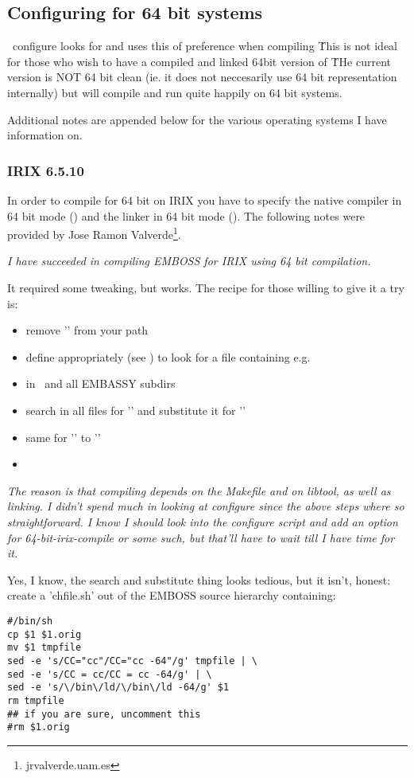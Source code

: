 \documentclass{report}
\begin{document}
\subsection{Configuring for 64 bit systems}

\EMBOSS\ configure looks for  and uses this of preference when compiling \EMBOSS\. This is not ideal for those who wish to have a compiled and linked 64bit version of \EMBOSS\. THe current version is NOT 64 bit clean (ie. it does not neccesarily use 64 bit representation internally) but will compile and run quite happily on 64 bit systems.

Additional notes are appended below for the various operating systems I have information on. 

\subsubsection{IRIX 6.5.10}

In order to compile for 64 bit on IRIX you have to specify the native compiler in 64 bit mode () and the linker in 64 bit mode (). The following notes were provided by Jose Ramon Valverde\footnote{jrvalverde\@@cnb.uam.es}. 


{\it I have succeeded in compiling EMBOSS for IRIX using 64 bit
compilation.

It required some tweaking, but works. The recipe for those willing to
give it a try is: }

\begin{itemize}
	\item remove '' from your path
	\item define  appropriately (see ) to look for a  file containing e.g. 
	\item {} in \EMBOSS\ and all EMBASSY subdirs
	\item search in all files for '' and substitute it for ''
	\item same for '' to ''
	\item {}
\end{itemize}

{\it The reason is that compiling depends on the Makefile and on libtool,
as well as linking. I didn't spend much in looking at configure since
the above steps where so straightforward. I know I should look into
the configure script and add an option for 64-bit-irix-compile or some
such, but that'll have to wait till I have time for it.

Yes, I know, the search and substitute thing looks tedious, but it
isn't, honest: create a 'chfile.sh' out of the EMBOSS source hierarchy
containing: }
\begin{verbatim}
#/bin/sh
cp $1 $1.orig
mv $1 tmpfile
sed -e 's/CC="cc"/CC="cc -64"/g' tmpfile | \
sed -e 's/CC = cc/CC = cc -64/g' | \
sed -e 's/\/bin\/ld/\/bin\/ld -64/g' $1 
rm tmpfile
## if you are sure, uncomment this 
#rm $1.orig
\end{verbatim}
\end{document}
